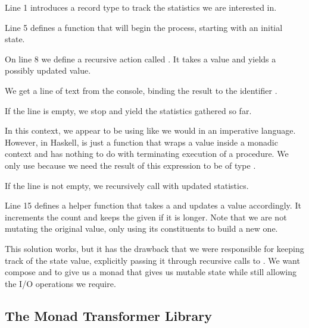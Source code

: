 \begin{notelist}
    \item Line 1 introduces a record type to track the statistics we are interested in.
    \item Line 5 defines a function that will begin the process, starting with an initial state.
    \item On line 8 we define a recursive  action called . It takes a 
          value and yields a possibly updated  value.
        \begin{notelist}
            \item We get a line of text from the console, binding the result to the identifier .
            \item If the line is empty, we stop and yield the statistics gathered so far. 
            \item In this context, we appear to be using  like we would in an imperative
                  language. However, in Haskell,  is just a function that wraps a 
                  value inside a monadic context and has nothing to do with terminating execution
                  of a procedure. We only use  because we need the result of this
                  expression to be of type .
            \item If the line is not empty, we recursively call  with updated statistics.
        \end{notelist}
    \item Line 15 defines a helper function that takes a  and  updates a  value 
          accordingly. It increments the count and keeps the given  if it is longer. Note
          that we are not mutating the original  value, only using its constituents to build
          a new one.
\end{notelist}

This solution works, but it has the drawback that we were responsible for keeping track of the state value,
explicitly passing it through recursive calls to . We want compose  and 
to give us a monad that gives us mutable state while still allowing the I/O operations we require.

\subsection{The Monad Transformer Library}

